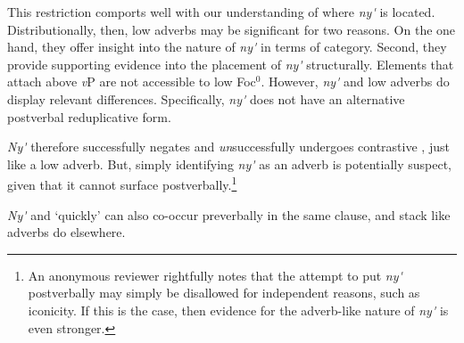 \documentclass[output=paper,modfonts,nonflat,
colorlinks, citecolor=brown,
]{langsci/langscibook}
\begin{document}
\label{ex:duncan-et-al:20}
\z

\noindent This restriction comports well with our understanding of where \textit{ny\'{\textturnv}\ng} is located. Distributionally, then, low adverbs may be significant for two reasons. On the one hand, they offer insight into the nature of \textit{ny\'{\textturnv}\ng} in terms of category. Second, they provide supporting evidence into the placement of \textit{ny\'{\textturnv}\ng} structurally. Elements that attach above \textit{v}P are not accessible to low Foc$^0$. However, \textit{ny\'{\textturnv}\ng} and low adverbs do display relevant differences. Specifically, \textit{ny\'{\textturnv}\ng} does not have an alternative postverbal reduplicative form.

\label{ex:duncan-et-al:21}
\z

\noindent \textit{Ny\'{\textturnv}\ng} therefore successfully negates and \textit{un}successfully undergoes contrastive , just like a low adverb. But, simply identifying \textit{ny\'{\textturnv}\ng} as an adverb is potentially suspect, given that it cannot surface postverbally.\footnote{An anonymous reviewer rightfully notes that the attempt to put \textit{ny\'{\textturnv}\ng} postverbally may simply be disallowed for independent reasons, such as iconicity. If this is the case, then evidence for the adverb-like nature of \textit{ny\'{\textturnv}\ng} is even stronger.}

\textit{Ny\'{\textturnv}\ng} and `quickly' can also co-occur preverbally in the same clause, and stack like adverbs do elsewhere.

\ea\label{ex:duncan-et-al:22}
\z
\z
\end{document}
